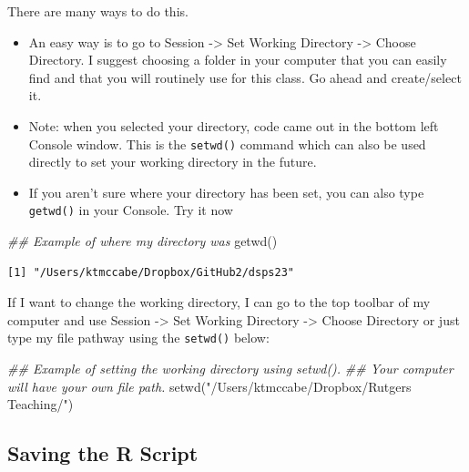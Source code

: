 \documentclass[
  letterpaper,
  DIV=11,
  numbers=noendperiod]{scrreprt}
\newenvironment{Shaded}{\begin{snugshade}}{\end{snugshade}}
\newcommand{\DocumentationTok}[1]{\textcolor[rgb]{0.37,0.37,0.37}{\textit{#1}}}
\newcommand{\FunctionTok}[1]{\textcolor[rgb]{0.28,0.35,0.67}{#1}}
\newcommand{\NormalTok}[1]{\textcolor[rgb]{0.00,0.23,0.31}{#1}}
\newcommand{\StringTok}[1]{\textcolor[rgb]{0.13,0.47,0.30}{#1}}
\providecommand{\tightlist}{%
  \setlength{\itemsep}{0pt}\setlength{\parskip}{0pt}}\usepackage{longtable,booktabs,array}
\begin{document}
There are many ways to do this.

\begin{itemize}
\tightlist
\item
  An easy way is to go to Session -\textgreater{} Set Working Directory
  -\textgreater{} Choose Directory. I suggest choosing a folder in your
  computer that you can easily find and that you will routinely use for
  this class. Go ahead and create/select it.
\item
  Note: when you selected your directory, code came out in the bottom
  left Console window. This is the \texttt{setwd()} command which can
  also be used directly to set your working directory in the future.
\item
  If you aren't sure where your directory has been set, you can also
  type \texttt{getwd()} in your Console. Try it now
\end{itemize}

\begin{Shaded}
\begin{Highlighting}[]
\DocumentationTok{\#\# Example of where my directory was}
\FunctionTok{getwd}\NormalTok{()}
\end{Highlighting}
\end{Shaded}

\begin{verbatim}
[1] "/Users/ktmccabe/Dropbox/GitHub2/dsps23"
\end{verbatim}

If I want to change the working directory, I can go to the top toolbar
of my computer and use Session -\textgreater{} Set Working Directory
-\textgreater{} Choose Directory or just type my file pathway using the
\texttt{setwd()} below:

\begin{Shaded}
\begin{Highlighting}[]
\DocumentationTok{\#\# Example of setting the working directory using setwd().}
\DocumentationTok{\#\# Your computer will have your own file path.}
\FunctionTok{setwd}\NormalTok{(}\StringTok{"/Users/ktmccabe/Dropbox/Rutgers Teaching/"}\NormalTok{)}
\end{Highlighting}
\end{Shaded}

\hypertarget{saving-the-r-script}{%
\subsection{Saving the R Script}\label{saving-the-r-script}}
\end{document}
